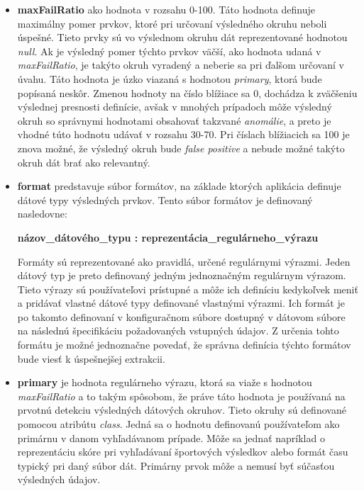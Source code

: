 \begin{itemize}
  \item \textbf{maxFailRatio} ako hodnota v rozsahu 0-100. Táto hodnota definuje maximálny pomer prvkov, ktoré pri určovaní výsledného okruhu neboli úspešné. Tieto prvky sú vo výslednom okruhu dát reprezentované hodnotou \textit{null}. Ak je výsledný pomer týchto prvkov väčší, ako hodnota udaná v \textit{maxFailRatio}, je takýto okruh vyradený a neberie sa pri ďalšom určovaní v úvahu. Táto hodnota je úzko viazaná s hodnotou \textit{primary}, ktorá bude popísaná neskôr. Zmenou hodnoty na číslo blížiace sa 0, dochádza k zväčšeniu výslednej presnosti definície, avšak v mnohých prípadoch môže výsledný okruh so správnymi hodnotami obsahovať takzvané \textit{anomálie}, a preto je vhodné túto hodnotu udávať v rozsahu 30-70. Pri číslach blížiacich sa 100 je znova možné, že výsledný okruh bude \textit{false positive} a nebude možné takýto okruh dát brať ako relevantný.
  \item \textbf{format} predstavuje súbor formátov, na základe ktorých aplikácia definuje dátové typy výsledných prvkov. Tento súbor formátov je definovaný nasledovne:
  
  \textbf{názov\_dátového\_typu : reprezentácia\_regulárneho\_výrazu}
  
  Formáty sú reprezentované ako pravidlá, určené regulárnymi výrazmi. Jeden  dátový typ je preto definovaný jedným jednoznačným regulárnym výrazom. Tieto výrazy sú používateľovi prístupné a môže ich definíciu kedykoľvek meniť a pridávať vlastné dátové typy definované vlastnými výrazmi. Ich formát je po takomto definovaní v konfiguračnom súbore dostupný v dátovom súbore na následnú špecifikáciu požadovaných vstupných údajov. Z určenia tohto formátu je možné jednoznačne povedať, že správna definícia týchto formátov bude viesť k úspešnejšej extrakcii. 
  
  \item \textbf{primary} je hodnota regulárneho výrazu, ktorá sa viaže s hodnotou \textit{maxFailRatio} a to takým spôsobom, že práve táto hodnota je používaná na prvotnú detekciu výsledných dátových okruhov. Tieto okruhy sú definované pomocou atribútu \textit{class}. Jedná sa o hodnotu definovanú používateľom ako primárnu v danom vyhľadávanom prípade. Môže sa jednať napríklad o reprezentáciu skóre pri vyhľadávaní športových výsledkov alebo formát času typický pri daný súbor dát. Primárny prvok môže a nemusí byť súčasťou výsledných údajov.
\end{itemize}

